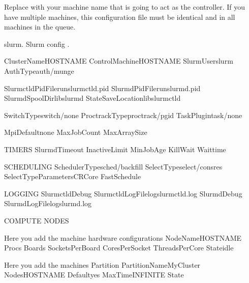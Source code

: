 \documentclass[letterpaper,10pt,english]{sphinxmanual}
\begin{document}
Replace  with your machine name that is going to act as the
controller. If you have multiple machines, this configuration file must be
identical and in all machines in the queue.

\begin{sphinxVerbatim}[commandchars=\\\{\}]
\PYGZsh{}\PYGZsh{}\PYGZsh{} slurm.  Slurm config .

\PYGZsh{}ClusterName\PYGZdl{}HOST\PYGZus{}NAME
ControlMachine\PYGZdl{}HOST\PYGZus{}NAME
SlurmUserslurm
AuthTypeauth/munge

SlurmctldPidFilerunslurmctld.pid
SlurmdPidFilerunslurmd.pid
SlurmdSpoolDirlibslurmd
StateSaveLocationlibslurmctld

SwitchTypeswitch/none
ProctrackTypeproctrack/pgid
TaskPlugintask/none

MpiDefaultnone
MaxJobCount
MaxArraySize

\PYGZsh{} TIMERS
SlurmdTimeout
InactiveLimit
MinJobAge
KillWait
Waittime

\PYGZsh{} SCHEDULING
SchedulerTypesched/backfill
SelectTypeselect/cons\PYGZus{}res
SelectTypeParametersCR\PYGZus{}Core
FastSchedule

\PYGZsh{} LOGGING
SlurmctldDebug
SlurmctldLogFilelogslurmctld.log
SlurmdDebug
SlurmdLogFilelogslurmd.log

\PYGZsh{} COMPUTE NODES

\PYGZsh{} Here you add the machine hardware configurations
NodeName\PYGZdl{}HOST\PYGZus{}NAME Procs Boards SocketsPerBoard CoresPerSocket ThreadsPerCore Stateidle

\PYGZsh{} Here you add the machines   Partition
PartitionNameMyCluster Nodes\PYGZdl{}HOST\PYGZus{}NAME Defaultyes MaxTimeINFINITE State
\end{sphinxVerbatim}
\end{document}
